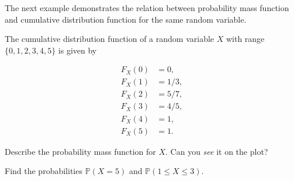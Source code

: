 \documentclass[../main.tex]{subfiles}
\begin{document}
The next example demonstrates the relation between probability mass function and cumulative distribution function for the same random variable. 

\begin{example} \label{ex:random-varialbe-pmf-to-cdf}
  The cumulative distribution function of a random variable \(X\) with range \(\{0,1,2,3,4,5\}\) is given by 

  \begin{minipage}{0.4\textwidth}
    \begin{align*}
      F_{X}(0) &= 0,  \\ 
      F_{X}(1) &= 1/3, \\
      F_{X}(2) &= 5/7, \\ 
      F_{X}(3) &= 4/5, \\ 
      F_{X}(4) &= 1,   \\
      F_{X}(5) &= 1.
    \end{align*}
  \end{minipage}
  \begin{minipage}{0.4\textwidth}
  \end{minipage}


  Describe the probability mass function for \(X\). Can you \emph{see} it on the plot?

  Find the probabilities \(\mathbb{P}(X = 5)\) and \(\mathbb{P}(1 \le X \le 3)\).

\end{example}

\end{document}
